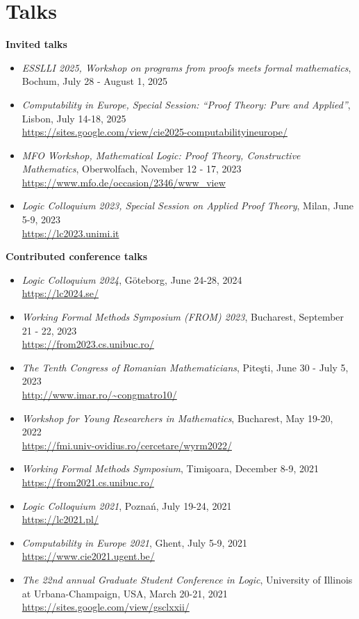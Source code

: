 \documentclass[letterpaper,11pt,oneside]{article}
\begin{document}
\section{Talks}
\noindent
\large{\textbf{Invited talks}} 
\normalsize
\begin{itemize}
    \item \emph{ESSLLI 2025, Workshop on programs from proofs meets formal mathematics},
    Bochum, July 28 - August 1, 2025 
    \item \emph{Computability in Europe, Special Session: ``Proof Theory: Pure and Applied''},
    Lisbon, July 14-18, 2025 \\ 
    \url{https://sites.google.com/view/cie2025-computabilityineurope/}
    \item \emph{MFO Workshop, Mathematical Logic: Proof Theory, Constructive Mathematics},
    Oberwolfach, November 12 - 17, 2023 \\ 
    \url{https://www.mfo.de/occasion/2346/www_view} 
    \item \emph{Logic Colloquium 2023, Special Session on Applied Proof Theory},
    Milan, June 5-9, 2023 \\ 
    \url{https://lc2023.unimi.it}
\end{itemize}
\normalsize
\mbox{}

\noindent
\large{\textbf{Contributed conference talks}}
\normalsize
\begin{itemize}
    \item \emph{Logic Colloquium 2024},
    G\"{o}teborg, June 24-28, 2024 \\ 
    \url{https://lc2024.se/}
    \item \emph{Working Formal Methods Symposium (FROM) 2023}, 
    Bucharest, September 21 - 22, 2023 \\ 
    \url{https://from2023.cs.unibuc.ro/}
    \item \emph{The Tenth Congress of Romanian Mathematicians},
    Pite\c{s}ti, June 30 - July 5, 2023 \\ 
    \url{http://www.imar.ro/~congmatro10/}
    \item \emph{Workshop for Young Researchers in Mathematics},
    Bucharest, May 19-20, 2022 \\
    \url{https://fmi.univ-ovidius.ro/cercetare/wyrm2022/}
    \item \emph{Working Formal Methods Symposium},
    Timi\c{s}oara, December 8-9, 2021 \\
    \url{https://from2021.cs.unibuc.ro/}
    \item \emph{Logic Colloquium 2021}, 
    Pozna\'n, July 19-24, 2021 \\ 
    \url{https://lc2021.pl/}
    \item \emph{Computability in Europe 2021}, 
    Ghent, July 5-9, 2021 \\ 
    \url{https://www.cie2021.ugent.be/}
    \item \emph{The 22nd annual Graduate Student Conference in Logic}, 
    University of Illinois at Urbana-Champaign, 
    USA, March 20-21, 2021 \\ 
    \url{https://sites.google.com/view/gsclxxii/}
\end{itemize}
\mbox{}
\end{document}

